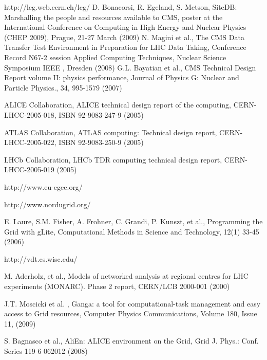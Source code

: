 \begin{thebibliography}{}
http://lcg.web.cern.ch/lcg/
%
D. Bonacorsi, R. Egeland, S. Metson, SiteDB: Marshalling the people and resources available to CMS, poster at the International Conference on Computing in High Energy and Nuclear Physics (CHEP 2009), Prague, 21-27 March (2009)
%
 N. Magini et al., The CMS Data Transfer Test Environment in Preparation for LHC Data Taking, Conference Record N67-2 session Applied Computing Techniques, Nuclear Science Symposium IEEE , Dresden (2008)
%
 G.L. Bayatian et al., CMS Technical Design Report volume II: physics performance, Journal of Physics G: Nuclear and Particle Physics., 34, 995-1579 (2007)
%

ALICE Collaboration, ALICE technical design report of the computing, CERN-LHCC-2005-018, ISBN 92-9083-247-9 (2005)

ATLAS Collaboration, ATLAS computing: Technical design report, CERN-LHCC-2005-022, ISBN 92-9083-250-9 (2005)

 LHCb Collaboration, LHCb TDR computing technical design report, CERN-LHCC-2005-019 (2005)

http://www.eu-egee.org/

http://www.nordugrid.org/

E. Laure, S.M. Fisher, A. Frohner, C. Grandi, P. Kunszt, et al., Programming the Grid with gLite, Computational Methods in Science and Technology, 12(1) 33-45 (2006)

http://vdt.cs.wisc.edu/

 M. Aderholz, et al., Models of networked analysis at regional centres for LHC experiments (MONARC). Phase 2 report, CERN/LCB 2000-001 (2000)

J.T. Moscicki et al. , Ganga: a tool for computational-task management and easy access to Grid resources, Computer Physics Communications, Volume 180, Issue 11, (2009)

S. Bagnasco et al., AliEn: ALICE environment on the Grid, Grid J. Phys.: Conf. Series 119 6 062012 (2008)

\end{thebibliography}



